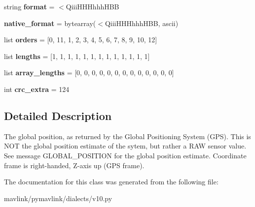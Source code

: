 \begin{DoxyCompactItemize}
\item 
\mbox{\label{classpymavlink_1_1dialects_1_1v10_1_1MAVLink__hil__gps__message_a51921ca5e7521bb84f1c91701e8743c5}} 
string {\bfseries format} = \textquotesingle{}$<$Qiii\+H\+H\+Hhhh\+H\+BB\textquotesingle{}
\item 
\mbox{\label{classpymavlink_1_1dialects_1_1v10_1_1MAVLink__hil__gps__message_a5a0258303842d4db6e38d26129f42a48}} 
{\bfseries native\+\_\+format} = bytearray(\textquotesingle{}$<$Qiii\+H\+H\+Hhhh\+H\+BB\textquotesingle{}, \textquotesingle{}ascii\textquotesingle{})
\item 
\mbox{\label{classpymavlink_1_1dialects_1_1v10_1_1MAVLink__hil__gps__message_a4c16619ffb5facceea35033e35159b5e}} 
list {\bfseries orders} = \mbox{[}0, 11, 1, 2, 3, 4, 5, 6, 7, 8, 9, 10, 12\mbox{]}
\item 
\mbox{\label{classpymavlink_1_1dialects_1_1v10_1_1MAVLink__hil__gps__message_ac1fc55042b43d31e5f13451469204185}} 
list {\bfseries lengths} = \mbox{[}1, 1, 1, 1, 1, 1, 1, 1, 1, 1, 1, 1, 1\mbox{]}
\item 
\mbox{\label{classpymavlink_1_1dialects_1_1v10_1_1MAVLink__hil__gps__message_a0931762c086e2e702ceee473702151fa}} 
list {\bfseries array\+\_\+lengths} = \mbox{[}0, 0, 0, 0, 0, 0, 0, 0, 0, 0, 0, 0, 0\mbox{]}
\item 
\mbox{\label{classpymavlink_1_1dialects_1_1v10_1_1MAVLink__hil__gps__message_a8425b334da910eedf3081a03888caf2f}} 
int {\bfseries crc\+\_\+extra} = 124
\end{DoxyCompactItemize}


\subsection{Detailed Description}
\begin{DoxyVerb}The global position, as returned by the Global Positioning
System (GPS). This is                  NOT the global position
estimate of the sytem, but rather a RAW sensor value. See
message GLOBAL_POSITION for the global position estimate.
Coordinate frame is right-handed, Z-axis up (GPS frame).
\end{DoxyVerb}
 

The documentation for this class was generated from the following file\+:\begin{DoxyCompactItemize}
\item 
mavlink/pymavlink/dialects/v10.\+py\end{DoxyCompactItemize}
